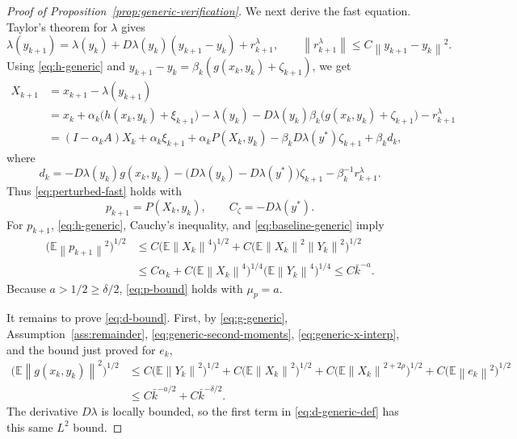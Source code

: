 \documentclass{article}
\newcommand{\E}{\mathbb{E}}
\newcommand{\norm}[1]{\left\lVert #1\right\rVert}
\begin{document}
\begin{proof}[Proof of Proposition~\ref{prop:generic-verification}]
We next derive the fast equation. Taylor's theorem for $\lambda$ gives
\begin{equation}
  \lambda(y_{k+1})
  =\lambda(y_k)+D\lambda(y_k)(y_{k+1}-y_k)+r^\lambda_{k+1},
  \qquad
  \norm{r^\lambda_{k+1}}\le C\norm{y_{k+1}-y_k}^2. \label{eq:lambda-taylor-generic}
\end{equation}
Using \eqref{eq:h-generic} and $y_{k+1}-y_k=\beta_k(g(x_k,y_k)+\zeta_{k+1})$, we get
\begin{align*}
  X_{k+1}
  &=x_{k+1}-\lambda(y_{k+1})\\
  &=x_k+\alpha_k\big(h(x_k,y_k)+\xi_{k+1}\big)-\lambda(y_k)
    -D\lambda(y_k)\beta_k\big(g(x_k,y_k)+\zeta_{k+1}\big)-r^\lambda_{k+1}\\
  &=(I-\alpha_kA)X_k+\alpha_k\xi_{k+1}+\alpha_kP(X_k,y_k)
    -\beta_kD\lambda(y^*)\zeta_{k+1}+\beta_kd_k,
\end{align*}
where
\begin{equation}
  d_k=-D\lambda(y_k)g(x_k,y_k)
      -\big(D\lambda(y_k)-D\lambda(y^*)\big)\zeta_{k+1}
      -\beta_k^{-1}r^\lambda_{k+1}. \label{eq:d-generic-def}
\end{equation}
Thus \eqref{eq:perturbed-fast} holds with
\[
  p_{k+1}=P(X_k,y_k),
  \qquad
  C_\zeta=-D\lambda(y^*).
\]
For $p_{k+1}$, \eqref{eq:h-generic}, Cauchy's inequality, and \eqref{eq:baseline-generic} imply
\begin{align*}
  \big(\E\norm{p_{k+1}}^2\big)^{1/2}
  &\le C\big(\E\norm{X_k}^4\big)^{1/2}
      +C\big(\E\norm{X_k}^2\norm{Y_k}^2\big)^{1/2}\\
  &\le C\alpha_k+C\big(\E\norm{X_k}^4\big)^{1/4}\big(\E\norm{Y_k}^4\big)^{1/4}
   \le C\bar k^{-a}.
\end{align*}
Because $a>1/2\ge\delta/2$, \eqref{eq:p-bound} holds with $\mu_p=a$.

It remains to prove \eqref{eq:d-bound}. First, by \eqref{eq:g-generic}, Assumption~\ref{ass:remainder}, \eqref{eq:generic-second-moments}, \eqref{eq:generic-x-interp}, and the bound just proved for $e_k$,
\begin{align*}
  \big(\E\norm{g(x_k,y_k)}^2\big)^{1/2}
  &\le C\big(\E\norm{Y_k}^2\big)^{1/2}
       +C\big(\E\norm{X_k}^2\big)^{1/2}
       +C\big(\E\norm{X_k}^{2+2\rho}\big)^{1/2}
       +C\big(\E\norm{e_k}^2\big)^{1/2}\\
  &\le C\bar k^{-a/2}+C\bar k^{-\delta/2}.
\end{align*}
The derivative $D\lambda$ is locally bounded, so the first term in \eqref{eq:d-generic-def} has this same $L^2$ bound.


\end{proof}
\end{document}
